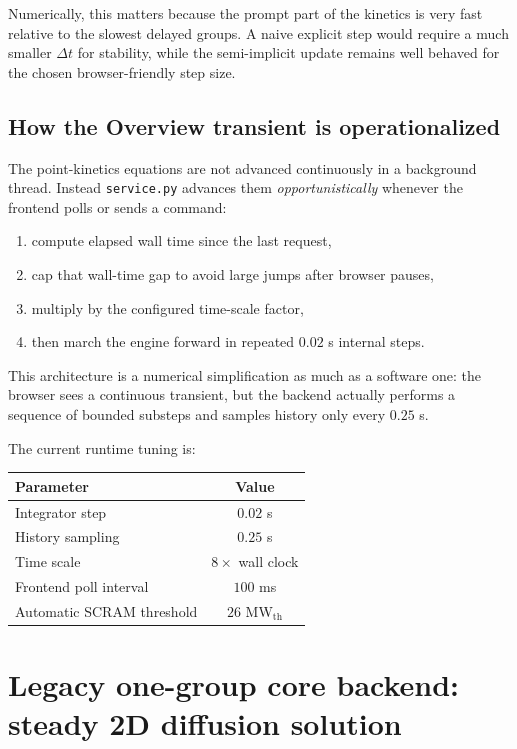 \documentclass[11pt]{article}
\begin{document}
Numerically, this matters because the prompt part of the kinetics is very fast
relative to the slowest delayed groups.  A naive explicit step would require a
much smaller $\Delta t$ for stability, while the semi-implicit update remains
well behaved for the chosen browser-friendly step size.

\subsection{How the Overview transient is operationalized}

The point-kinetics equations are not advanced continuously in a background
thread.  Instead \texttt{service.py} advances them \emph{opportunistically}
whenever the frontend polls or sends a command:
\begin{enumerate}
  \item compute elapsed wall time since the last request,
  \item cap that wall-time gap to avoid large jumps after browser pauses,
  \item multiply by the configured time-scale factor,
  \item then march the engine forward in repeated $0.02$ s internal steps.
\end{enumerate}

This architecture is a numerical simplification as much as a software one: the
browser sees a continuous transient, but the backend actually performs a sequence
of bounded substeps and samples history only every $0.25$ s.

The current runtime tuning is:
\begin{center}
\begin{tabular}{lc}
\toprule
Parameter & Value \\
\midrule
Integrator step & $0.02$ s \\
History sampling & $0.25$ s \\
Time scale & $8\times$ wall clock \\
Frontend poll interval & $100$ ms \\
Automatic SCRAM threshold & $26$ MW$_{\mathrm{th}}$ \\
\bottomrule
\end{tabular}
\end{center}

\section{Legacy one-group core backend: steady 2D diffusion solution}
\end{document}
